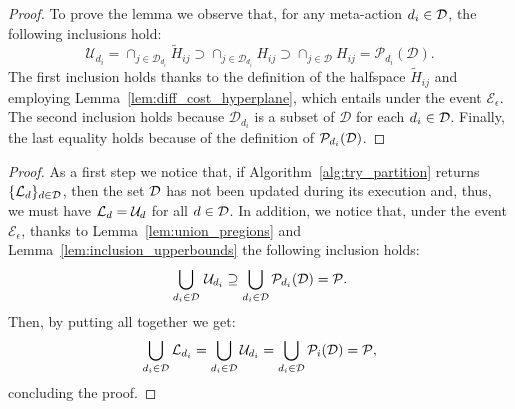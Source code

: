 \begin{proof}
	To prove the lemma we observe that, for any meta-action $d_i \in \mathcal{D}$, the following inclusions hold:
	\begin{equation*}
		\mathcal{U}_{d_i} = \cap_{j \in \mathcal{D}_{d_i}} \widetilde H_{ij}\supset \cap_{j \in \mathcal{D}_{d_i}} H_{ij} \supset \cap_{j \in \mathcal{D}} H_{ij}= \mathcal{P}_{d_i}(\mathcal{D}).
	\end{equation*}
	The first inclusion holds thanks to the definition of the halfspace $\widetilde{H}_{ij}$ and employing Lemma~\ref{lem:diff_cost_hyperplane}, which entails under the event $\mathcal{E}_\epsilon$. The second inclusion holds because $\mathcal{D}_{d_i}$ is a subset of $\mathcal{D}$ for each $d_i \in \mathcal{D}$. Finally, the last equality holds because of the definition of $\mathcal{P}_{d_i}(\mathcal{D})$.
\end{proof}



\lowerbounds*
\begin{proof}
	As a first step we notice that, if Algorithm~\ref{alg:try_partition} returns $\{\mathcal{L}_d\}_{d \in \mathcal{D}}$, then the set $\mathcal{D}$ has not been updated during its execution and, thus, we must have $\mathcal{L}_d=\mathcal{U}_d$ for all $d \in \mathcal{D}$. In addition, we notice that, under the event $\mathcal{E}_\epsilon$, thanks to Lemma~\ref{lem:union_pregions} and Lemma~\ref{lem:inclusion_upperbounds} the following inclusion holds:
	$$\bigcup_{d_i \in \mathcal{D}} \, \mathcal{U}_{d_i} \supseteq \bigcup_{d_i \in \mathcal{D}} \mathcal{P}_{d_i}(\mathcal{D}) = \mathcal{P}.$$
	Then, by putting all together we get:
	\begin{equation*}
	\bigcup_{d_i\in \mathcal{D}} \mathcal{L}_{d_i} = \bigcup_{d_i\in \mathcal{D}} \mathcal{U}_{d_i} = \bigcup_{d_i\in \mathcal{D}} \mathcal{P}_{i}(\mathcal{D}) = \mathcal{P},
	\end{equation*}
	concluding the proof.
\end{proof}




